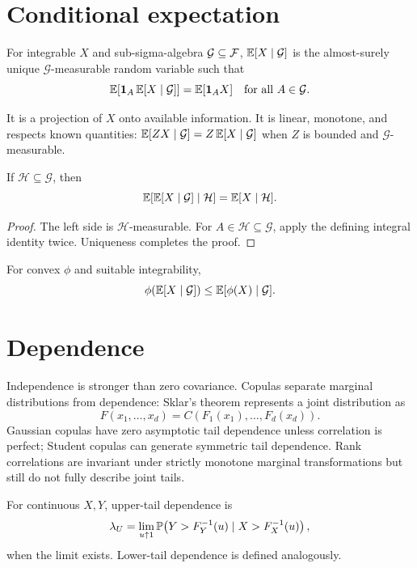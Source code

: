 \section{Conditional expectation}

\begin{definition}
For integrable $X$ and sub-sigma-algebra $\mathcal G\subseteq\mathcal F$,
$\operatorname{\mathbb E}[X\mid\mathcal G]$ is the almost-surely unique $\mathcal G$-measurable random
variable such that
\[
\operatorname{\mathbb E}[\mathbf 1_A\operatorname{\mathbb E}[X\mid\mathcal G]]
=\operatorname{\mathbb E}[\mathbf 1_AX]\quad\text{for all }A\in\mathcal G.
\]
\end{definition}

It is a projection of $X$ onto available information. It is linear, monotone, and
respects known quantities:
$\operatorname{\mathbb E}[ZX\mid\mathcal G]=Z\operatorname{\mathbb E}[X\mid\mathcal G]$ when $Z$ is bounded and
$\mathcal G$-measurable.

\begin{theorem}
If $\mathcal H\subseteq\mathcal G$, then
\[
\operatorname{\mathbb E}[\operatorname{\mathbb E}[X\mid\mathcal G]\mid\mathcal H]=\operatorname{\mathbb E}[X\mid\mathcal H].
\]
\end{theorem}
\begin{proof}
The left side is $\mathcal H$-measurable. For $A\in\mathcal H\subseteq\mathcal G$,
apply the defining integral identity twice. Uniqueness completes the proof.
\end{proof}

\begin{proposition}
For convex $\phi$ and suitable integrability,
\[
\phi(\operatorname{\mathbb E}[X\mid\mathcal G])\leq\operatorname{\mathbb E}[\phi(X)\mid\mathcal G].
\]
\end{proposition}

\section{Dependence}

Independence is stronger than zero covariance. Copulas separate marginal
distributions from dependence: Sklar's theorem represents a joint distribution as
\[
F(x_1,\ldots,x_d)=C(F_1(x_1),\ldots,F_d(x_d)).
\]
Gaussian copulas have zero asymptotic tail dependence unless correlation is perfect;
Student copulas can generate symmetric tail dependence. Rank correlations are
invariant under strictly monotone marginal transformations but still do not fully
describe joint tails.

\begin{definition}
For continuous $X,Y$, upper-tail dependence is
\[
\lambda_U=\lim_{u\uparrow1}
\mathbb P\!\left(Y>F_Y^{-1}(u)\mid X>F_X^{-1}(u)\right),
\]
when the limit exists. Lower-tail dependence is defined analogously.
\end{definition}


